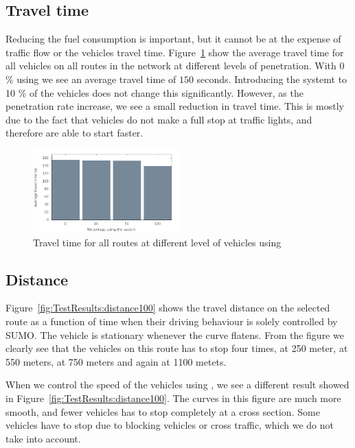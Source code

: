 \subsection{Travel time}
Reducing the fuel consumption is important, but it cannot be at the expense of traffic flow or the vehicles travel time.
Figure~\ref{fig:TestResults:combinedTime} show the average travel time for all vehicles on all routes in the network at different levels of penetration.
With 0 \% using \tech we see an average travel time of $150$ seconds. 
Introducing the systemt to 10 \% of the vehicles does not change this significantly. 
However, as the penetration rate increase, we see a small reduction in travel time. 
This is mostly due to the fact that vehicles do not make a full stop at traffic lights, and therefore are able to start faster.

\begin{figure}[h]
\includegraphics[width=0.5\textwidth]{../images/tp0c1_0/combinedTime.png}
\caption{Travel time for all routes at different level of vehicles using \tech}
\label{fig:TestResults:combinedTime}
\end{figure}

\subsection{Distance}
Figure~\ref{fig:TestResults:distance100} shows the travel distance on the selected route as a function of time when their driving behaviour is solely controlled by SUMO. 
The vehicle is stationary whenever the curve flatens.
From the figure we clearly see that the vehicles on this route has to stop four times, at 250 meter, at 550 meters, at 750 meters and again at 1100 metets.

When we control the speed of the vehicles using \tech, we see a different result showed in Figure~\ref{fig:TestResults:distance100}.
The curves in this figure are much more smooth, and fewer vehicles has to stop completely at a cross section.
Some vehicles have to stop due to blocking vehicles or cross traffic, which we do not take into account.

